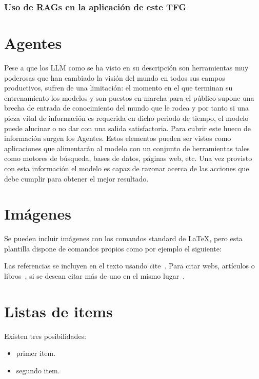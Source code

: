 \subsubsection{Uso de RAGs en la aplicación de este TFG}



\section{Agentes}
\label{sec:agentes}
Pese a que los LLM como se ha visto en su descripción son herramientas muy poderosas que han cambiado la visión del mundo en todos sus campos productivos, sufren de una limitación: el momento en el que terminan su entrenamiento los modelos y son puestos en marcha para el público supone una brecha de entrada de conocimiento del mundo que le rodea y por tanto si una pieza vital de información es requerida en dicho periodo de tiempo, el modelo puede alucinar o no dar con una salida satisfactoria. Para cubrir este hueco de información surgen los Agentes.
Estos elementos pueden ser vistos como aplicaciones que alimentarán al modelo con un conjunto de herramientas tales como motores de búsqueda, bases de datos, páginas web, etc. Una vez provisto con esta información el modelo es capaz de razonar acerca de las acciones que debe cumplir para obtener el mejor resultado.


\section{Imágenes}

Se pueden incluir imágenes con los comandos standard de \LaTeX, pero esta plantilla dispone de comandos propios como por ejemplo el siguiente:


Las referencias se incluyen en el texto usando cite~\cite{wiki:latex}. Para citar webs, artículos o libros~\cite{koza92}, si se desean citar más de uno en el mismo lugar~\cite{bortolot2005, koza92}.

\section{Listas de items}

Existen tres posibilidades:

\begin{itemize}
	\item primer item.
	\item segundo item.
\end{itemize}

